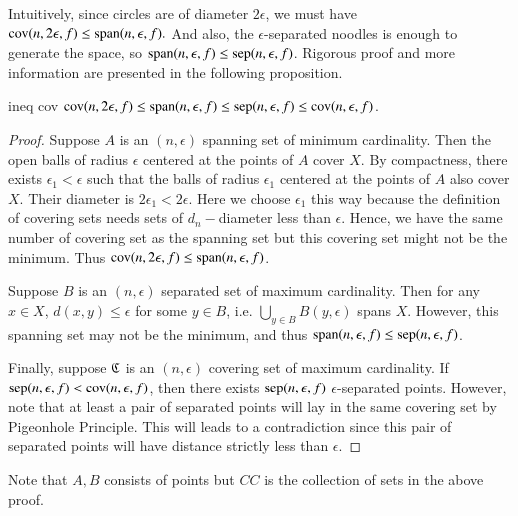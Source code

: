 \documentclass[12pt,a4paper]{article}
\begin{document}
	 
	 Intuitively, since circles are of diameter $2\epsilon$, we must have $\text{cov}(n,2\epsilon,f)\leq \text{span}(n,\epsilon,f).$ And also, the $\epsilon$-separated noodles is enough to generate the space, so $\text{span}(n,\epsilon,f)\leq \text{sep}(n,\epsilon,f)$. Rigorous proof and more information are presented in the following proposition.
	 \begin{proposition}{}{ineq cov}
	 	$\text{cov}(n,2\epsilon,f)\leq \text{span}(n,\epsilon,f)\leq \text{sep}(n,\epsilon,f)\leq \text{cov}(n,\epsilon,f)$.
	 \end{proposition}
	\begin{proof}
		Suppose $A$ is an $(n,\epsilon)$ spanning set of minimum cardinality. Then the open balls of radius $\epsilon$ centered at the points of $A$ cover $X$. By compactness, there exists $\epsilon_1<\epsilon$ such that the balls of radius $\epsilon_1$ centered at the points of $A$ also cover $X$. Their diameter is $2\epsilon_1<2\epsilon$. Here we choose $\epsilon_1$ this way because the definition of covering sets needs sets of $d_n-$diameter less than $\epsilon$. Hence, we have the same number of covering set as the spanning set but this covering set might not be the minimum. Thus $\text{cov}(n,2\epsilon,f)\leq \text{span}(n,\epsilon,f)$.
		
		Suppose $B$ is an $(n,\epsilon)$ separated set of maximum cardinality. Then for any $x\in X$, $d(x,y)\leq \epsilon$ for some $y\in B$, i.e. $\bigcup_{y\in B} B(y,\epsilon)$ spans $X$. However, this spanning set may not be the minimum, and thus $\text{span}(n,\epsilon,f)\leq \text{sep}(n,\epsilon,f)$.
		
		Finally, suppose $\mathfrak{C}$ is an $(n,\epsilon)$ covering set of maximum cardinality. If $\text{sep}(n,\epsilon,f)< \text{cov}(n,\epsilon,f)$, then there exists $\text{sep}(n,\epsilon,f)$ $\epsilon$-separated points. However, note that at least a pair of separated points will lay in the same covering set by Pigeonhole Principle. This will leads to a contradiction since this pair of separated points will have distance strictly less than $\epsilon$.
	\end{proof}
	Note that $A,B$ consists of points but $CC$ is the collection of sets in the above proof.
	
\end{document}
